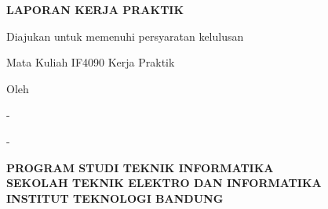 \begin{titlepage}
\begin{center}
\vspace*{1.2cm}
{\bfseries\Large LAPORAN KERJA PRAKTIK\par}
{\bfseries\Large \JudulLaporan\par}
\vspace{2.2cm}
{Diajukan untuk memenuhi persyaratan kelulusan\par
Mata Kuliah IF4090 Kerja Praktik\par}
\vspace{1.0cm}
{Oleh\par
\Large \NamaMahasiswa - \NIM\par
\Large \NamaMahasiswaDua - \NIMDua\par}
\vfill
\PlaceholderLogo
\vfill
{\bfseries\large PROGRAM STUDI TEKNIK INFORMATIKA\\
SEKOLAH TEKNIK ELEKTRO DAN INFORMATIKA\\
INSTITUT TEKNOLOGI BANDUNG\\
\Tahun\par}
\end{center}
\end{titlepage}
